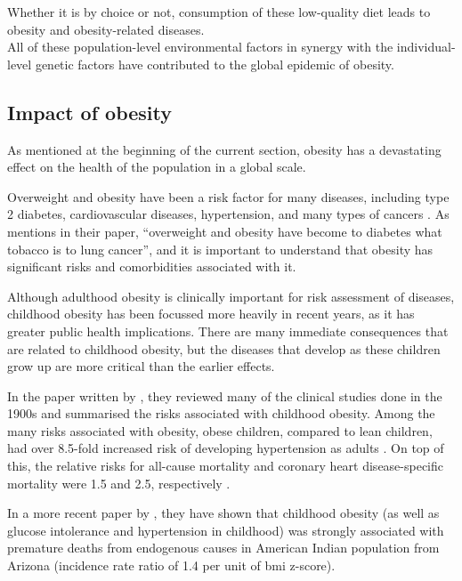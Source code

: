 Whether it is by choice or not, consumption of these low-quality diet leads to obesity and obesity-related diseases. \\

\noindent
All of these population-level environmental factors in synergy with the individual-level genetic factors have contributed to the global epidemic of obesity.

\subsection{Impact of obesity}
\label{sub:impact_of_obesity}

As mentioned at the beginning of the current section, obesity has a devastating effect on the health of the population in a global scale.

Overweight and obesity have been a risk factor for many diseases, including type 2 diabetes, cardiovascular diseases, hypertension, and many types of cancers \citep{Franks2010, Guh2009, Yach2006}.
As \citet{Yach2006} mentions in their paper, ``overweight and obesity have become to diabetes what tobacco is to lung cancer'', and it is important to understand that obesity has significant risks and comorbidities associated with it.

Although adulthood obesity is clinically important for risk assessment of diseases, childhood obesity has been focussed more heavily in recent years,  as it has greater public health implications.
There are many immediate consequences that are related to childhood obesity, but the diseases that develop as these children grow up are more critical than the earlier effects.

In the paper written by \citet{Must1999}, they reviewed many of the clinical studies done in the 1900s and summarised the risks associated with childhood obesity.
Among the many risks associated with obesity, obese children, compared to lean children, had over 8.5-fold increased risk of developing hypertension as adults \citep{Must1999}.
On top of this, the relative risks for all-cause mortality and coronary heart disease-specific mortality were 1.5 and 2.5, respectively \citep{Must1999}.

In a more recent paper by \citep{Franks2010}, they have shown that childhood obesity (as well as glucose intolerance and hypertension in childhood) was strongly associated with premature deaths from endogenous causes in American Indian population from Arizona (incidence rate ratio of 1.4 per unit of \gls{bmi} z-score).\\

